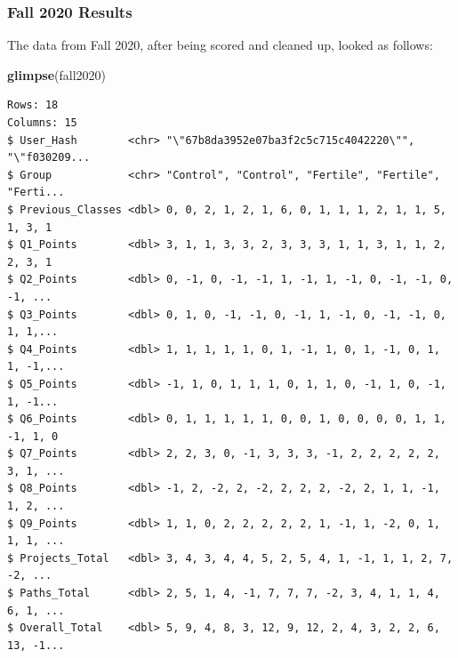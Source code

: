 \documentclass[12pt,twoside]{reedthesis}
\newenvironment{Shaded}{\begin{snugshade}}{\end{snugshade}}
\newcommand{\KeywordTok}[1]{\textcolor[rgb]{0.13,0.29,0.53}{\textbf{#1}}}
\newcommand{\NormalTok}[1]{#1}
\begin{document}
\hypertarget{fall-2020-results}{%
\subsubsection{Fall 2020 Results}\label{fall-2020-results}}

The data from Fall 2020, after being scored and cleaned up, looked as follows:
\begin{Shaded}
\begin{Highlighting}[]
\KeywordTok{glimpse}\NormalTok{(fall2020)}
\end{Highlighting}
\end{Shaded}
\small
\begin{verbatim}
Rows: 18
Columns: 15
$ User_Hash        <chr> "\"67b8da3952e07ba3f2c5c715c4042220\"", "\"f030209...
$ Group            <chr> "Control", "Control", "Fertile", "Fertile", "Ferti...
$ Previous_Classes <dbl> 0, 0, 2, 1, 2, 1, 6, 0, 1, 1, 1, 2, 1, 1, 5, 1, 3, 1
$ Q1_Points        <dbl> 3, 1, 1, 3, 3, 2, 3, 3, 3, 1, 1, 3, 1, 1, 2, 2, 3, 1
$ Q2_Points        <dbl> 0, -1, 0, -1, -1, 1, -1, 1, -1, 0, -1, -1, 0, -1, ...
$ Q3_Points        <dbl> 0, 1, 0, -1, -1, 0, -1, 1, -1, 0, -1, -1, 0, 1, 1,...
$ Q4_Points        <dbl> 1, 1, 1, 1, 1, 0, 1, -1, 1, 0, 1, -1, 0, 1, 1, -1,...
$ Q5_Points        <dbl> -1, 1, 0, 1, 1, 1, 0, 1, 1, 0, -1, 1, 0, -1, 1, -1...
$ Q6_Points        <dbl> 0, 1, 1, 1, 1, 1, 0, 0, 1, 0, 0, 0, 0, 1, 1, -1, 1, 0
$ Q7_Points        <dbl> 2, 2, 3, 0, -1, 3, 3, 3, -1, 2, 2, 2, 2, 2, 3, 1, ...
$ Q8_Points        <dbl> -1, 2, -2, 2, -2, 2, 2, 2, -2, 2, 1, 1, -1, 1, 2, ...
$ Q9_Points        <dbl> 1, 1, 0, 2, 2, 2, 2, 2, 1, -1, 1, -2, 0, 1, 1, 1, ...
$ Projects_Total   <dbl> 3, 4, 3, 4, 4, 5, 2, 5, 4, 1, -1, 1, 1, 2, 7, -2, ...
$ Paths_Total      <dbl> 2, 5, 1, 4, -1, 7, 7, 7, -2, 3, 4, 1, 1, 4, 6, 1, ...
$ Overall_Total    <dbl> 5, 9, 4, 8, 3, 12, 9, 12, 2, 4, 3, 2, 2, 6, 13, -1...
\end{verbatim}
\normalsize
\end{document}

